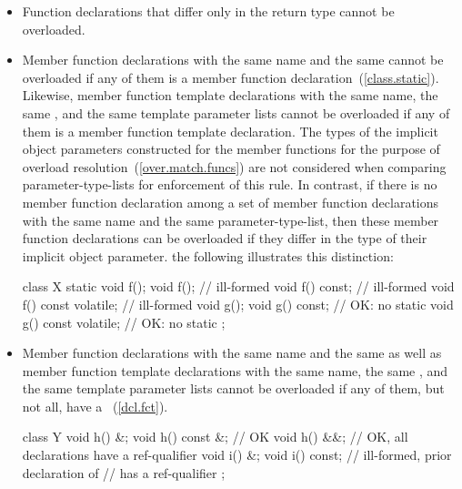 \begin{itemize}
\item
{}%
Function declarations that differ only in the return type cannot be
overloaded.
\item
{}%
Member function declarations with the same name and the same
 cannot be overloaded if any of them is a
member function declaration~(\ref{class.static}).
Likewise, member function template declarations with the same name,
the same , and the same template parameter lists cannot be
overloaded if any of them is a
member function template declaration.
The types of the implicit object parameters constructed for the member
functions for the purpose of overload resolution~(\ref{over.match.funcs})
are not considered when comparing parameter-type-lists for enforcement of
this rule.
In contrast, if there is no
member function declaration among a set of member function
declarations with the same name and the same parameter-type-list, then
these member function declarations can be overloaded if they differ in
the type of their implicit object parameter.
\enterexample
the following illustrates this distinction:

\begin{codeblock}
class X {
  static void f();
  void f();                     // ill-formed
  void f() const;               // ill-formed
  void f() const volatile;      // ill-formed
  void g();
  void g() const;               // OK: no static 
  void g() const volatile;      // OK: no static 
};
\end{codeblock}
\exitexample

\item Member function declarations with the same name and the same
 as well as member function template
declarations with the same name, the same , and
the same template parameter lists cannot be overloaded if any of them, but not
all, have a ~(\ref{dcl.fct}). \enterexample

\begin{codeblock}
class Y {
  void h() &;
  void h() const &;             // OK
  void h() &&;                  // OK, all declarations have a ref-qualifier
  void i() &;
  void i() const;               // ill-formed, prior declaration of 
                                // has a ref-qualifier
};
\end{codeblock}
\exitexample

\end{itemize}

